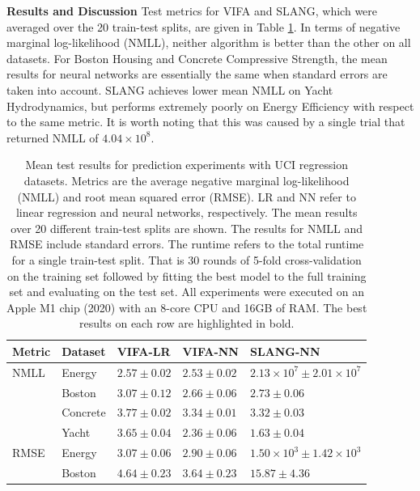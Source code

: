 \documentclass[10pt]{article} %
\begin{document}
\textbf{ Results and Discussion} Test metrics for VIFA and SLANG, which were averaged over the 20 train-test splits, are given in Table \ref{table:neural_nets_uci_mean}. In terms of negative marginal log-likelihood (NMLL), neither algorithm is better than the other on all datasets. For Boston Housing and Concrete Compressive Strength, the mean results for neural networks are essentially the same when standard errors are taken into account. SLANG achieves lower mean NMLL on Yacht Hydrodynamics, but performs extremely poorly on Energy Efficiency with respect to the same metric. It is worth noting that this was caused by a single trial that returned NMLL of $4.04 \times 10^{8}$. 

\begin{table}[!h]
\caption{Mean test results for prediction experiments with UCI regression datasets. Metrics are the average negative marginal log-likelihood (NMLL) and root mean squared error (RMSE). LR and NN refer to linear regression and neural networks, respectively. The mean results over 20 different train-test splits are shown. The results for NMLL and RMSE include standard errors. The runtime refers to the total runtime for a single train-test split. That is 30 rounds of 5-fold cross-validation on the training set followed by fitting the best model to the full training set and evaluating on the test set. All experiments were executed on an Apple M1 chip (2020) with an 8-core CPU and 16GB of RAM. The best results on each row are highlighted in bold.}
\label{table:neural_nets_uci_mean}
\begin{center}
\begin{tabular}{lllll}
\textbf{Metric}  & \textbf{Dataset}  & \textbf{VIFA-LR} & \textbf{VIFA-NN} & \textbf{SLANG-NN} \\ \hline
NMLL 	& Energy 		& $\mathbf{2.57 \pm 0.02}$ 	& $\mathbf{2.53 \pm            0.02}$ 	& $2.13 \times 10^{7} \pm 2.01 \times 10^{7}$ \\ 	
		& Boston   	& $3.07 \pm 0.12$			& $\mathbf{2.66 \pm 0.06}$ 	& $\mathbf{2.73 \pm 0.06}$ \\ 			
		& Concrete	& $3.77 \pm 0.02$ 			& $\mathbf{3.34 \pm 0.01}$ 	& $\mathbf{3.32 \pm 0.03}$ \\ 			
 	& Yacht    		& $3.65 \pm 0.04$ 			& $2.36 \pm 0.06$ 			& $\mathbf{1.63 \pm 0.04}$ \\ \hline
RMSE 	& Energy 	 	& $3.07 \pm 0.06$  			& $\mathbf{2.90 \pm 0.06}$ 	& $1.50 \times 10^{3} \pm 1.42 \times 10^{3}$ \\ 
		& Boston 	 	& $4.64 \pm 0.23$ 			& $\mathbf{3.64 \pm 0.23}$ 	& $15.87 \pm 4.36$ \\ 

\end{tabular}
\end{center}
\end{table}
\end{document}
